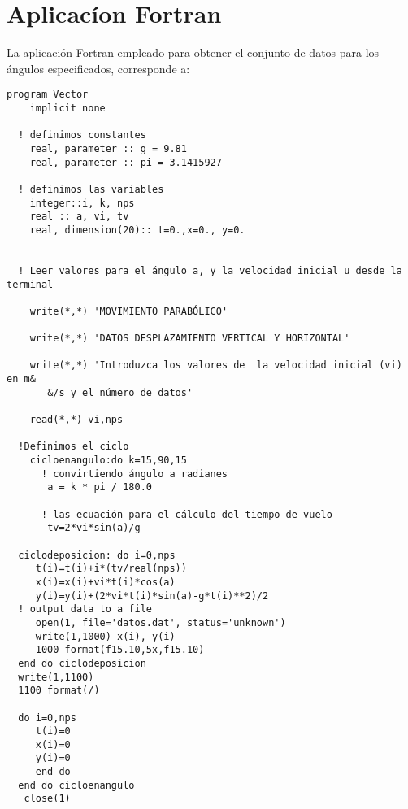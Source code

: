 \documentclass[12pt,a4paper]{article}
\begin{document}
\section{Aplicacíon Fortran}
La aplicación Fortran empleado para obtener el conjunto de datos para los ángulos especificados, corresponde a:
\begin{verbatim}
program Vector
    implicit none

  ! definimos constantes
    real, parameter :: g = 9.81
    real, parameter :: pi = 3.1415927
  
  ! definimos las variables
    integer::i, k, nps
    real :: a, vi, tv
    real, dimension(20):: t=0.,x=0., y=0.
  

  ! Leer valores para el ángulo a, y la velocidad inicial u desde la terminal
  
    write(*,*) 'MOVIMIENTO PARABÓLICO'
    
    write(*,*) 'DATOS DESPLAZAMIENTO VERTICAL Y HORIZONTAL'
    
    write(*,*) 'Introduzca los valores de  la velocidad inicial (vi) en m&
       &/s y el número de datos'
  
    read(*,*) vi,nps

  !Definimos el ciclo
    cicloenangulo:do k=15,90,15
      ! convirtiendo ángulo a radianes
       a = k * pi / 180.0

      ! las ecuación para el cálculo del tiempo de vuelo
       tv=2*vi*sin(a)/g
       
  ciclodeposicion: do i=0,nps
     t(i)=t(i)+i*(tv/real(nps))
     x(i)=x(i)+vi*t(i)*cos(a)
     y(i)=y(i)+(2*vi*t(i)*sin(a)-g*t(i)**2)/2
  ! output data to a file
     open(1, file='datos.dat', status='unknown')
     write(1,1000) x(i), y(i)
     1000 format(f15.10,5x,f15.10)
  end do ciclodeposicion
  write(1,1100)
  1100 format(/)
 
  do i=0,nps
     t(i)=0
     x(i)=0
     y(i)=0
     end do
  end do cicloenangulo
   close(1)

\end{verbatim}
\end{document}
